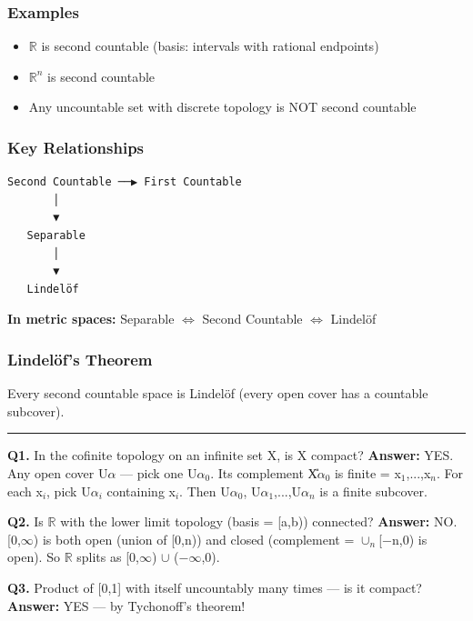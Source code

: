 \documentclass[12pt,a4paper,openany]{book}
\begin{document}
{{\subsubsection{Examples}
\begin{itemize}[leftmargin=*]
  \item $\mathbb{R}$ is second countable (basis: intervals with rational endpoints)
  \item $\mathbb{R}^n$ is second countable
  \item Any uncountable set with discrete topology is NOT second countable
\end{itemize}

\subsubsection{Key Relationships }
\begin{verbatim}
Second Countable ──▶ First Countable
       │                    
       ▼                    
   Separable               
       │                    
       ▼                    
   Lindelöf
\end{verbatim}

\textbf{In metric spaces:} Separable $\Longleftrightarrow$ Second Countable $\Longleftrightarrow$ Lindelöf

\subsubsection{Lindelöf's Theorem}
Every second countable space is Lindelöf (every open cover has a countable subcover).

\bigskip\noindent\rule{\textwidth}{0.4pt}\bigskip


\textbf{Q1.} In the cofinite topology on an infinite set X, is X compact?
\textbf{Answer:} YES. Any open cover {U$\alpha$} — pick one U$\alpha_0$. Its complement X\U$\alpha_0$ is finite = {x$_1$,...,x$_n$}. For each x$_i$, pick U$\alpha_i$ containing x$_i$. Then {U$\alpha_0$, U$\alpha_1$,...,U$\alpha_n$} is a finite subcover.

\textbf{Q2.} Is $\mathbb{R}$ with the lower limit topology (basis = {[a,b)}) connected?
\textbf{Answer:} NO. [0,$\infty$) is both open (union of [0,n)) and closed (complement = $\cup_n$[−n,0) is open). So $\mathbb{R}$ splits as [0,$\infty$) $\cup$ (−$\infty$,0).

\textbf{Q3.} Product of [0,1] with itself uncountably many times — is it compact?
\textbf{Answer:} YES — by Tychonoff's theorem!

}}
\end{document}
